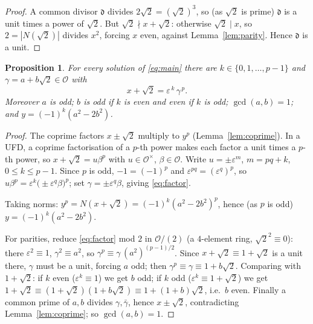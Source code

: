 \documentclass{amsart}
\newtheorem{proposition}{Proposition}
\theoremstyle{definition}
\begin{document}
\begin{proof}
A common divisor $\mathfrak d$ divides $2\sqrt2=(\sqrt2)^3$, so (as $\sqrt2$ is
prime) $\mathfrak d$ is a unit times a power of $\sqrt2$. But $\sqrt2\nmid
x+\sqrt2$: otherwise $\sqrt2\mid x$, so $2=|N(\sqrt2)|$ divides $x^2$, forcing
$x$ even, against Lemma~\ref{lem:parity}. Hence $\mathfrak d$ is a unit.
\end{proof}

\begin{proposition}\label{prop:reduction}
For every solution of \eqref{eq:main} there are $k\in\{0,1,\dots,p-1\}$ and
$\gamma=a+b\sqrt2\in\mathcal{O}$ with
\begin{equation}\label{eq:factor}
x+\sqrt2=\varepsilon^{\,k}\,\gamma^{\,p}.
\end{equation}
Moreover $a$ is odd; $b$ is odd if $k$ is even and even if $k$ is odd;
$\gcd(a,b)=1$; and $y=(-1)^k(a^2-2b^2)$.
\end{proposition}

\begin{proof}
The coprime factors $x\pm\sqrt2$ multiply to $y^p$
(Lemma~\ref{lem:coprime}). In a UFD, a coprime factorisation of a $p$-th power
makes each factor a unit times a $p$-th power, so $x+\sqrt2=u\beta^p$ with
$u\in\mathcal O^\times$, $\beta\in\mathcal O$. Write $u=\pm\varepsilon^m$,
$m=pq+k$, $0\le k\le p-1$. Since $p$ is odd, $-1=(-1)^p$ and
$\varepsilon^{pq}=(\varepsilon^q)^p$, so
$u\beta^p=\varepsilon^k\big(\pm\varepsilon^q\beta\big)^p$; set
$\gamma=\pm\varepsilon^q\beta$, giving \eqref{eq:factor}.

Taking norms: $y^p=N(x+\sqrt2)=(-1)^k(a^2-2b^2)^p$, hence (as $p$ is odd)
$y=(-1)^k(a^2-2b^2)$.

For parities, reduce \eqref{eq:factor} mod $2$ in $\mathcal O/(2)$ (a
$4$-element ring, $\sqrt2^2\equiv0$): there $\varepsilon^2\equiv1$,
$\gamma^2\equiv a^2$, so $\gamma^p\equiv\gamma\,(a^2)^{(p-1)/2}$. Since
$x+\sqrt2\equiv1+\sqrt2$ is a unit there, $\gamma$ must be a unit, forcing $a$
odd; then $\gamma^p\equiv\gamma\equiv1+b\sqrt2$. Comparing with $1+\sqrt2$:
if $k$ even ($\varepsilon^k\equiv1$) we get $b$ odd; if $k$ odd
($\varepsilon^k\equiv1+\sqrt2$) we get
$1+\sqrt2\equiv(1+\sqrt2)(1+b\sqrt2)\equiv1+(1+b)\sqrt2$, i.e.\ $b$ even.
Finally a common prime of $a,b$ divides $\gamma,\bar\gamma$, hence
$x\pm\sqrt2$, contradicting Lemma~\ref{lem:coprime}; so $\gcd(a,b)=1$.
\end{proof}
\end{document}
